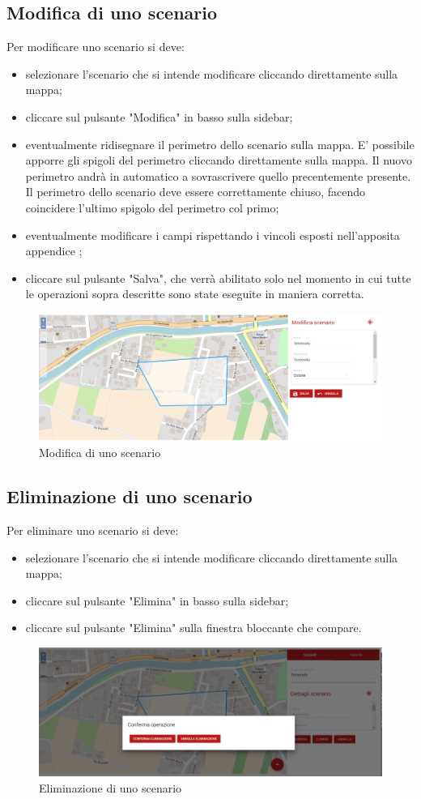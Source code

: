 \subsection{Modifica di uno scenario}
	Per modificare uno scenario si deve:
	\begin{itemize}
		\item selezionare l'scenario che si intende modificare cliccando direttamente sulla mappa;
		\item cliccare sul pulsante "Modifica" in basso sulla sidebar;
		\item eventualmente ridisegnare il perimetro dello scenario sulla mappa. E' possibile apporre gli spigoli del perimetro cliccando direttamente sulla mappa. Il nuovo perimetro andrà in automatico a sovrascrivere quello precentemente presente. Il perimetro dello scenario deve essere correttamente chiuso, facendo coincidere l'ultimo spigolo del perimetro col primo;
		\item eventualmente modificare i campi rispettando i vincoli esposti nell'apposita appendice ;
		\item cliccare sul pulsante "Salva", che verrà abilitato solo nel momento in cui tutte le operazioni sopra descritte sono state eseguite in maniera corretta.
	\end{itemize}
	
	\begin{figure}[H]
	\centering
	\includegraphics[width=\textwidth]{img/modifica_scenario.png}
	\caption{Modifica di uno scenario}
	\end{figure}

\subsection{Eliminazione di uno scenario}
Per eliminare uno scenario si deve:
\begin{itemize}
	\item selezionare l'scenario che si intende modificare cliccando direttamente sulla mappa;
	\item cliccare sul pulsante "Elimina" in basso sulla sidebar;
	\item cliccare sul pulsante "Elimina" sulla finestra bloccante che compare.
\end{itemize}

\begin{figure}[H]
\centering
\includegraphics[width=\textwidth]{img/eliminazione_bloccante_scenario.png}
\caption{Eliminazione di uno scenario}
\end{figure}